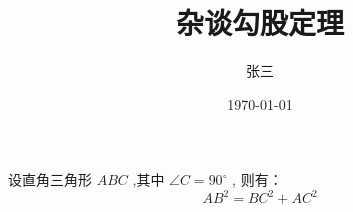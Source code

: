 \documentclass{book} %
\title{杂谈勾股定理}
\author{张三}
\date{\today}
\newcommand\degree{^\circ} %
\begin{document}
    \maketitle %

    设直角三角形 $ABC$ ,其中 $\angle C=90\degree$ , 则有：
    \begin{equation} %
        AB^2 = BC^2 + AC^2
    \end{equation}
\end{document}
